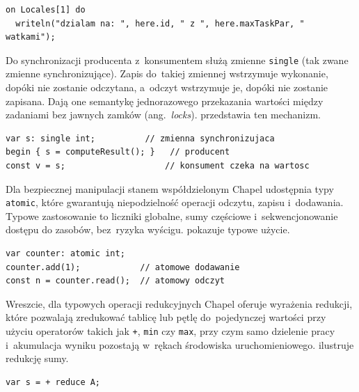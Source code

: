 \begin{lstlisting}[language=Chapel, caption={Przeniesienie wykonania na~konkretny locale z~użyciem \texttt{here}.}, label={lst:on-here}]
on Locales[1] do
  writeln("dzialam na: ", here.id, " z ", here.maxTaskPar, " watkami");
\end{lstlisting}

Do synchronizacji producenta z~konsumentem służą zmienne \texttt{single} (tak zwane
zmienne synchronizujące). Zapis do~takiej zmiennej wstrzymuje wykonanie, dopóki nie zostanie
odczytana, a~odczyt wstrzymuje je, dopóki nie zostanie zapisana. Dają one semantykę jednorazowego
przekazania wartości między zadaniami bez jawnych zamków (ang.~\emph{locks}).
 przedstawia ten mechanizm.

\begin{lstlisting}[language=Chapel, caption={Zmienna synchronizująca jako kanał jednorazowy między zadaniami.}, label={lst:sync}]
var s: single int;          // zmienna synchronizujaca
begin { s = computeResult(); }   // producent
const v = s;                    // konsument czeka na wartosc
\end{lstlisting}

Dla bezpiecznej manipulacji stanem współdzielonym Chapel udostępnia typy
\texttt{atomic}, które gwarantują niepodzielność operacji odczytu, zapisu i~dodawania.
Typowe zastosowanie to liczniki globalne, sumy częściowe i~sekwencjonowanie
dostępu do zasobów, bez~ryzyka wyścigu.  pokazuje typowe użycie.

\begin{lstlisting}[language=Chapel, caption={Operacje atomowe na liczniku współdzielonym.}, label={lst:atomic}]
var counter: atomic int;
counter.add(1);            // atomowe dodawanie
const n = counter.read();  // atomowy odczyt
\end{lstlisting}

Wreszcie, dla typowych operacji redukcyjnych Chapel oferuje wyrażenia
redukcji, które pozwalają zredukować tablicę lub pętlę do~pojedynczej wartości
przy użyciu operatorów takich jak \texttt{+}, \texttt{min} czy \texttt{max},
przy czym samo dzielenie pracy i~akumulacja wyniku pozostają w~rękach środowiska
uruchomieniowego.  ilustruje redukcję sumy.

\begin{lstlisting}[language=Chapel, caption={Suma wszystkich elementów tablicy \texttt{A}.}, label={lst:reduce}]
var s = + reduce A;
\end{lstlisting}

